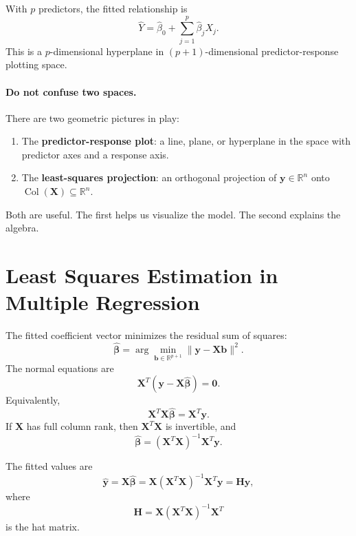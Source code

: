 With \(p\) predictors, the fitted relationship is
\begin{equation}
  \boxed{\widehat{Y}=\widehat{\beta}_0+\sum_{j=1}^p \widehat{\beta}_jX_j.}
\end{equation}
This is a \(p\)-dimensional hyperplane in \((p+1)\)-dimensional predictor-response plotting space.

\paragraph{Do not confuse two spaces.}
There are two geometric pictures in play:
\begin{enumerate}
  \item The \textbf{predictor-response plot}: a line, plane, or hyperplane in the space with predictor axes and a response axis.
  \item The \textbf{least-squares projection}: an orthogonal projection of \(\mathbf{y}\in\mathbb{R}^n\) onto \(\operatorname{Col}(\mathbf{X})\subseteq\mathbb{R}^n\).
\end{enumerate}
Both are useful.  The first helps us visualize the model.  The second explains the algebra.

\section{Least Squares Estimation in Multiple Regression}

The fitted coefficient vector minimizes the residual sum of squares:
\begin{equation}
  \widehat{\boldsymbol{\beta}}
  =\arg\min_{\mathbf{b}\in\mathbb{R}^{p+1}}\|\mathbf{y}-\mathbf{X}\mathbf{b}\|^2.
\end{equation}
The normal equations are
\begin{equation}
  \mathbf{X}^T\left(\mathbf{y}-\mathbf{X}\widehat{\boldsymbol{\beta}}\right)=\mathbf{0}.
\end{equation}
Equivalently,
\begin{equation}
  \mathbf{X}^T\mathbf{X}\widehat{\boldsymbol{\beta}}=\mathbf{X}^T\mathbf{y}.
\end{equation}
If \(\mathbf{X}\) has full column rank, then \(\mathbf{X}^T\mathbf{X}\) is invertible, and
\begin{equation}
  \boxed{\widehat{\boldsymbol{\beta}}
  =(\mathbf{X}^T\mathbf{X})^{-1}\mathbf{X}^T\mathbf{y}.}
\end{equation}

The fitted values are
\begin{equation}
  \widehat{\mathbf{y}}=\mathbf{X}\widehat{\boldsymbol{\beta}}
  =\mathbf{X}(\mathbf{X}^T\mathbf{X})^{-1}\mathbf{X}^T\mathbf{y}
  =\mathbf{H}\mathbf{y},
\end{equation}
where
\begin{equation}
  \mathbf{H}=\mathbf{X}(\mathbf{X}^T\mathbf{X})^{-1}\mathbf{X}^T
\end{equation}
is the hat matrix.

